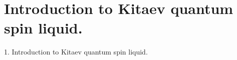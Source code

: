 
\section{Introduction to Kitaev quantum spin liquid.} %

\begin{frame}
\centerline{1. Introduction to Kitaev quantum spin liquid.}
\end{frame}



